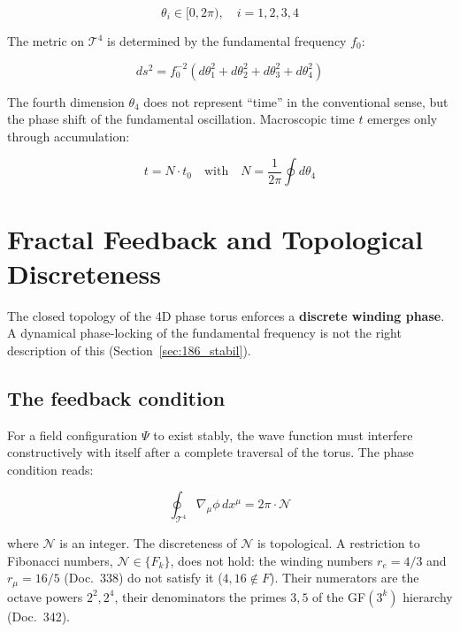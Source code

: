 	\begin{equation}
		\theta_i \in [0, 2\pi),\quad i=1,2,3,4
	\end{equation}
	
	The metric on $\mathcal{T}^4$ is determined by the fundamental frequency $f_0$:
	
	\begin{equation}
		ds^2 = f_0^{-2} \left( d\theta_1^2 + d\theta_2^2 + d\theta_3^2 + d\theta_4^2 \right)
	\end{equation}
	
	The fourth dimension $\theta_4$ does not represent ``time'' in the conventional sense, but the phase shift of the fundamental oscillation. Macroscopic time $t$ emerges only through accumulation:
	
	\begin{equation}
		t = N \cdot t_0 \quad \text{with} \quad N = \frac{1}{2\pi} \oint d\theta_4
	\end{equation}
	
	\section{Fractal Feedback and Topological Discreteness}
	
	The closed topology of the 4D phase torus enforces a \textbf{discrete winding phase}. A dynamical phase-locking of the fundamental frequency is not the right description of this (Section~\ref{sec:186_stabil}).
	
	\subsection{The feedback condition}
	
	For a field configuration $\Psi$ to exist stably, the wave function must interfere constructively with itself after a complete traversal of the torus. The phase condition reads:
	
	\begin{equation}
		\oint_{\mathcal{T}^4} \nabla_{\mu} \phi \, dx^\mu = 2\pi \cdot \mathcal{N}
	\end{equation}
	
	where $\mathcal{N}$ is an integer. The discreteness of $\mathcal{N}$ is topological. A restriction to Fibonacci numbers, $\mathcal{N} \in \{F_k\}$, does not hold: the winding numbers $r_e = 4/3$ and $r_\mu = 16/5$ (Doc.~338) do not satisfy it ($4, 16 \notin F$). Their numerators are the octave powers $2^2, 2^4$, their denominators the primes $3, 5$ of the GF$(3^k)$ hierarchy (Doc.~342).
	
